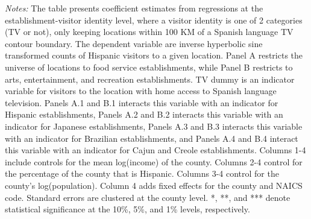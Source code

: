 \begin{table}[!htbp]
{\begin{threeparttable}
\begin{tablenotes}[flushleft]
				\item \textit{Notes:} The table presents coefficient estimates from regressions at the establishment-visitor identity level, where a visitor identity is one of 2 categories (TV or not), only keeping locations within 100 KM of a Spanish language TV contour boundary. The dependent variable are inverse hyperbolic sine transformed counts of Hispanic visitors to a given location. Panel A restricts the universe of locations to food service establishments, while Panel B restricts to arts, entertainment, and recreation establishments. TV dummy is an indicator variable for visitors to the location with home access to Spanish language television. Panels A.1 and B.1 interacts this variable with an indicator for Hispanic establishments, Panels A.2 and B.2 interacts this variable with an indicator for Japanese establishments, Panels A.3 and B.3 interacts this variable with an indicator for Brazilian establishments, and Panels A.4 and B.4 interact this variable with an indicator for Cajun and Creole establishments.   Columns 1-4 include controls for the mean log(income) of the county. Columns 2-4 control for the percentage of the county that is Hispanic. Columns 3-4 control for the county's log(population). Column 4 adds fixed effects for the county and NAICS code. Standard errors are clustered at the county level. *, **, and *** denote statistical significance at the 10\%, 5\%, and 1\% levels, respectively.
			\end{tablenotes}
		\end{threeparttable}
	}
\end{table}